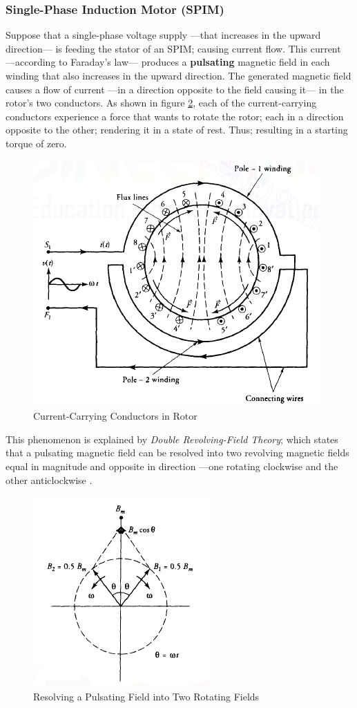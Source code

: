 \documentclass[journal]{IEEEtran}
\begin{document}
\subsubsection{Single-Phase Induction Motor (SPIM)}
Suppose that a single-phase voltage supply —that increases in the upward direction— is feeding the stator of an SPIM; causing current flow. This current —according to Faraday's law— produces a \textbf{pulsating} magnetic field in each winding that also increases in the upward direction. The generated magnetic field causes a flow of current —in a direction opposite to the field causing it— in the rotor's two conductors. As shown in figure \ref{fig:rotorsingle}, each of the current-carrying conductors experience a force that wants to rotate the rotor; each in a direction opposite to the other; rendering it in a state of rest. Thus; resulting in a starting torque of zero.
\begin{figure}[h]
    \centering
    \includegraphics[scale=0.5]{Induction/single_construction.PNG}
    \caption{Current-Carrying Conductors in Rotor \cite{guru2007}}
    \label{fig:rotorsingle}
\end{figure}
\newline
This phenomenon is explained by \textit{Double Revolving-Field Theory}; which states that a pulsating magnetic field can be resolved into two revolving magnetic fields equal in magnitude and opposite in direction —one rotating clockwise and the other anticlockwise \cite{guru2007}.
\begin{figure}[h]
    \centering
    \includegraphics[scale=0.50]{Induction/double_revolving.PNG}
    \caption{Resolving a Pulsating Field into Two Rotating Fields \cite{guru2007}}
    \label{fig:rotorsingle}
\end{figure}
\end{document}
